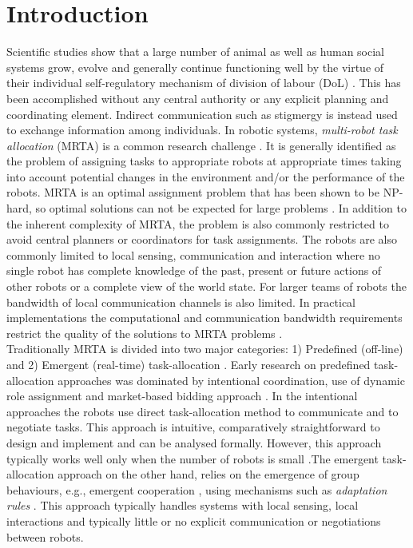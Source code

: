 \documentclass{llncs}
\begin{document}
\section{Introduction}
\label{sec:intro}
Scientific studies show that a large number of animal as well as human social systems grow, evolve and generally continue functioning well by the virtue of their individual self-regulatory mechanism of division of labour (DoL)  \cite{Bonabeau+1999}.
This has been accomplished without any central authority or any explicit planning and coordinating element.
Indirect communication such as stigmergy is instead used to exchange information among individuals. 
In robotic systems, \textit{multi-robot task allocation} (MRTA) is a common research challenge \cite{Gerkey+2004}.
It is generally identified as the problem of assigning tasks to appropriate robots at appropriate times taking into account potential changes in the environment and/or the performance of the robots.
MRTA is an optimal assignment problem that has been shown to be NP-hard, so optimal solutions can not be expected for large problems \cite{Parker2008}.
In addition to the inherent complexity of MRTA, the problem is also commonly restricted to avoid central planners or coordinators for task assignments.
The robots are also commonly limited to local sensing, communication and interaction \cite{Lerman+2006} where no single robot has complete knowledge of the past, present or future actions of other robots or a complete view of the world state.
For larger teams of robots the bandwidth of local communication channels is also limited.
In practical implementations the computational and communication bandwidth requirements restrict the quality of the solutions to MRTA problems \cite{Gerkey+2004,Lerman+2006}.\\
Traditionally MRTA is divided into two major categories: 1) Predefined (off-line) and 2) Emergent (real-time) task-allocation \cite{Shen+2001}. Early research on predefined task-allocation approaches was dominated by intentional coordination, use of dynamic role assignment \cite{Parker2008} and market-based bidding approach \cite{Dias+2006}.
In the intentional approaches the robots use direct task-allocation method to communicate and to negotiate tasks.
This approach is intuitive, comparatively straightforward to design and implement and can be analysed formally.
However, this approach typically works well only when the number of robots is small \cite{Lerman+2006}.The emergent task-allocation approach on the other hand, relies on the emergence of group behaviours, e.g., emergent cooperation \cite{Lerman+2006}, using mechanisms such as {\em adaptation rules} \cite{Liu+2007}. This approach typically handles systems with local sensing, local interactions and typically little or no explicit communication or negotiations between robots.
\end{document}
